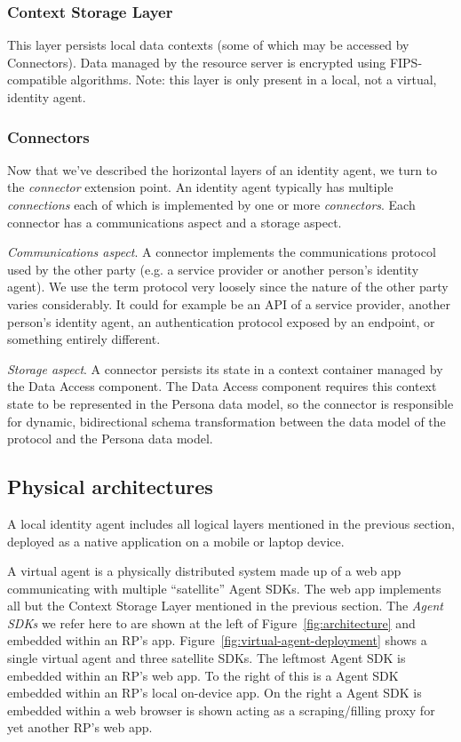 \documentclass[11pt, oneside]{article}   	%
\begin{document}
\subsubsection{Context Storage Layer}

This layer persists local data contexts (some of which may be accessed by Connectors). Data managed by the resource server is encrypted using FIPS-compatible algorithms. Note: this layer is only present in a local, not a virtual, identity agent.

\subsubsection{Connectors}

Now that we've described the horizontal layers of an identity agent, we turn to the \emph{connector} extension point. An identity agent typically has multiple \emph{connections} each of which is implemented by one or more \emph{connectors}. Each connector has a communications aspect and a storage aspect.

\emph{Communications aspect}. A connector implements the communications protocol used by the other party (e.g. a service provider or another person's identity agent). We use the term protocol very loosely since the nature of the other party varies considerably. It could for example be an API of a service provider, another person's identity agent, an authentication protocol exposed by an endpoint, or something entirely different.

\emph{Storage aspect}. A connector persists its state in a context container managed by the Data Access component. The Data Access component requires this context state to be represented in the Persona data model, so the connector is responsible for dynamic, bidirectional schema transformation between the data model of the protocol and the Persona data model.

\subsection{Physical architectures}

A local identity agent includes all logical layers mentioned in the previous section, deployed as a native application on a mobile or laptop device.

A virtual agent is a physically distributed system made up of a web app communicating with multiple ``satellite'' Agent SDKs. The web app implements all but the Context Storage Layer mentioned in the previous section. The \emph{Agent SDKs} we refer here to are shown at the left of Figure~\ref{fig:architecture} and embedded within an RP's app. Figure~\ref{fig:virtual-agent-deployment} shows a single virtual agent and three satellite SDKs. The leftmost Agent SDK is embedded within an RP's web app. To the right of this is a Agent SDK embedded within an RP's local on-device app. On the right a Agent SDK is embedded within a web browser is shown acting as a scraping/filling proxy for yet another RP's web app. 
\end{document}
